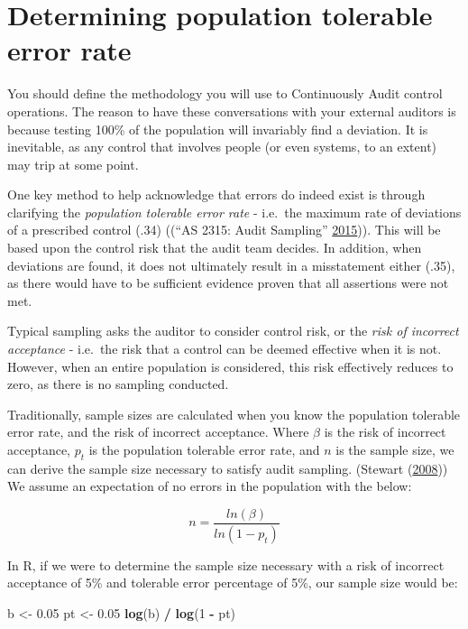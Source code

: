 \documentclass[
]{book}
\newenvironment{Shaded}{\begin{snugshade}}{\end{snugshade}}
\newcommand{\DecValTok}[1]{\textcolor[rgb]{0.00,0.00,0.81}{#1}}
\newcommand{\FloatTok}[1]{\textcolor[rgb]{0.00,0.00,0.81}{#1}}
\newcommand{\KeywordTok}[1]{\textcolor[rgb]{0.13,0.29,0.53}{\textbf{#1}}}
\newcommand{\NormalTok}[1]{#1}
\newcommand{\OperatorTok}[1]{\textcolor[rgb]{0.81,0.36,0.00}{\textbf{#1}}}
\newcommand{\StringTok}[1]{\textcolor[rgb]{0.31,0.60,0.02}{#1}}
\begin{document}
\hypertarget{determining-population-tolerable-error-rate}{%
\section{Determining population tolerable error rate}\label{determining-population-tolerable-error-rate}}

You should define the methodology you will use to Continuously Audit control operations. The reason to have these conversations with your external auditors is because testing 100\% of the population will invariably find a deviation. It is inevitable, as any control that involves people (or even systems, to an extent) may trip at some point.

One key method to help acknowledge that errors do indeed exist is through clarifying the \emph{population tolerable error rate} - i.e.~the maximum rate of deviations of a prescribed control (.34) ((``AS 2315: Audit Sampling'' \protect\hyperlink{ref-pcaob-as2315}{2015})). This will be based upon the control risk that the audit team decides. In addition, when deviations are found, it does not ultimately result in a misstatement either (.35), as there would have to be sufficient evidence proven that all assertions were not met.

Typical sampling asks the auditor to consider control risk, or the \emph{risk of incorrect acceptance} - i.e.~the risk that a control can be deemed effective when it is not. However, when an entire population is considered, this risk effectively reduces to zero, as there is no sampling conducted.

Traditionally, sample sizes are calculated when you know the population tolerable error rate, and the risk of incorrect acceptance. Where \(\beta\) is the risk of incorrect acceptance, \(p_{t}\) is the population tolerable error rate, and \(n\) is the sample size, we can derive the sample size necessary to satisfy audit sampling. (Stewart (\protect\hyperlink{ref-sampling-technical}{2008})) We assume an expectation of no errors in the population with the below:

\[
n = \frac{ln(\beta)}{ln(1 - p_{t})}
\]

In R, if we were to determine the sample size necessary with a risk of incorrect acceptance of 5\% and tolerable error percentage of 5\%, our sample size would be:

\begin{Shaded}
\begin{Highlighting}[]
\NormalTok{b <-}\StringTok{ }\FloatTok{0.05}
\NormalTok{pt <-}\StringTok{ }\FloatTok{0.05}
\KeywordTok{log}\NormalTok{(b) }\OperatorTok{/}\StringTok{ }\KeywordTok{log}\NormalTok{(}\DecValTok{1} \OperatorTok{-}\StringTok{ }\NormalTok{pt)}
\end{Highlighting}
\end{Shaded}
\end{document}
